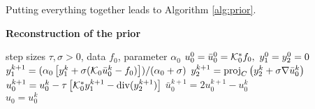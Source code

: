 Putting everything together leads to Algorithm \ref{alg:prior}.
\begin{algorithm}[t!] 
\caption{\textbf{Reconstruction of the prior}}
{
\begin{algorithmic}[1]
\Require step sizes $\tau,\sigma > 0$, data $f_0$, parameter $\alpha_0$
\Ensure $u_0^0 = \bar{u}_0^0 = \mathcal{K}_0^*f_0, ~ y_1^0 = y_2^0 = 0$
        \State $y_1^{k+1} = (\alpha_0 \left[ y_1^k + \sigma (\mathcal{K}_0 \bar{u}_0^k - f_0)\right]) / (\alpha_0 + \sigma)$
          \State $y_2^{k+1} = \mathrm{proj}_C \left(y_2^k + \sigma \nabla \bar{u}_0^k\right)$
          \State $u_0^{k+1} =  u_0^k - \tau \left[ \mathcal{K}_0^* y_1^{k+1} - \mathrm{div}(y_2^{k+1}) \right]$
          \State $\bar{u}_0^{k+1}= 2 u_0^{k+1} - u_0^k$
	\EndWhile\\
\Return $u_0 = u_0^k$
\end{algorithmic}
}
\label{alg:prior}
\end{algorithm}
\ \\

